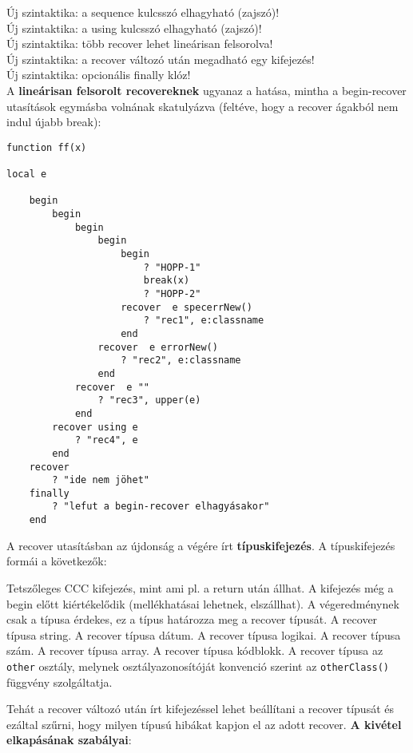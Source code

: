 Új szintaktika: a sequence kulcsszó elhagyható (zajszó)!\\
Új szintaktika: a using kulcsszó elhagyható (zajszó)!\\
Új szintaktika: több recover lehet lineárisan felsorolva!\\
Új szintaktika: a recover változó után megadható egy kifejezés!\\
Új szintaktika: opcionális finally klóz!\\

A {\bf lineárisan felsorolt recovereknek} ugyanaz a hatása, mintha 
a begin-recover utasítások  egymásba volnának skatulyázva
(feltéve, hogy a recover ágakból nem indul újabb break):

\begin{verbatim}
function ff(x)

local e

    begin
        begin
            begin
                begin
                    begin
                        ? "HOPP-1"
                        break(x)
                        ? "HOPP-2"
                    recover  e specerrNew() 
                        ? "rec1", e:classname
                    end
                recover  e errorNew()
                    ? "rec2", e:classname
                end
            recover  e ""
                ? "rec3", upper(e)
            end
        recover using e
            ? "rec4", e
        end
    recover
        ? "ide nem jöhet"
    finally
        ? "lefut a begin-recover elhagyásakor"
    end
\end{verbatim}


A recover utasításban az újdonság a végére írt 
{\bf típuskifejezés}. A típuskifejezés formái a következők:
\begin{itemize}
    Tetszőleges CCC kifejezés, mint  ami pl. a return után állhat. 
    A kifejezés még a begin előtt kiértékelődik 
    (mellékhatásai lehetnek, elszállhat).
    A végeredménynek csak a típusa érdekes, 
    ez a típus határozza meg a recover típusát.
 A recover típusa string.
 A recover típusa dátum.
 A recover típusa logikai.
 A recover típusa szám.
 A recover típusa array.
 A recover típusa kódblokk.
    A recover típusa az \verb!other! osztály, melynek 
    osztályazonosítóját konvenció szerint az \verb!otherClass()! 
    függvény szolgáltatja.
\end{itemize}


Tehát a recover változó után írt kifejezéssel lehet 
beállítani a recover típusát és ezáltal szűrni, hogy
milyen típusú hibákat kapjon el az adott recover.
{\bf A kivétel elkapásának szabályai}:

